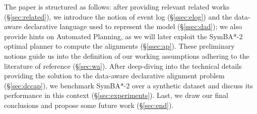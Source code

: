 The paper is structured as follows: after providing relevant related works (\S\ref{sec:related}), we introduce the notion of event log (\S\ref{ssec:elog}) and the data-aware declarative language used to represent the model (\S\ref{ssec:dad}); we also provide hints on Automated Planning, as we will later exploit the SymBA*-2 optimal planner to compute the alignments (\S\ref{ssec:ap}). These preliminary notions guide us into the definition of our  working assumptions adhering to the literature of reference (\S\ref{sec:wa}). After deep-diving into the technical details providing the solution to the data-aware declarative alignment problem (\S\ref{sec:dccap}), we benchmark SymBA*-2 over a synthetic dataset and discuss its performance in this context (\S\ref{sec:experiments}). Last, we draw our final conclusions and propose some future work (\S\ref{sec:end}).



